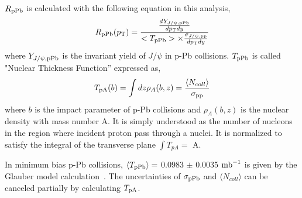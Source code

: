 $R_{\rm{pPb}}$ is calculated with the following equation in this analysis, 
\begin{equation}
  R_{\rm{pPb}} (p_{\rm{T}}) = \frac{ \frac{ dY_{J/\psi , \rm{pPb}} }{ dp_{\rm{T}}dy } }{<T_{\rm{pPb}}>\times \frac{\sigma_{J/\psi, \rm{pp}}}{dp_{\rm{T}}dy}}
\end{equation}
where $Y_{J/\psi ,\rm{ pPb}}$ is the invariant yield of $J/\psi$ in p-Pb collisions. 
$T_{\rm{pPb}}$ is called "Nuclear Thickness Function'' expressed as, 
\begin{equation}
  T_{\rm{p}A}(b) = \int{dz \rho_{A}(b,z)} = \frac{\langle N_{coll}\rangle }{\sigma_{\rm{pp}}}
\end{equation}
 where $b$ is the impact parameter of p-Pb collisions and $\rho_{A}(b, z)$ is the nuclear density with mass number A.  
It is simply understood as the number of nucleons in the region where incident proton pass through a nuclei. 
It is normalized to satisfy the integral of the transverse plane $\int{T_{pA}} =$ A.

In minimum bias p-Pb collisions, $\langle T_{\rm{pPb}}\rangle =$ 0.0983 $\pm$ 0.0035 $\rm{mb}^{-1}$ is given by the Glauber model calculation~\cite{bib_tppb}.
The uncertainties of $\sigma_{\rm{pPb}}$ and $\langle N_{coll}\rangle$ can be canceled partially by calculating ${T_{\rm{p}A}}$.

